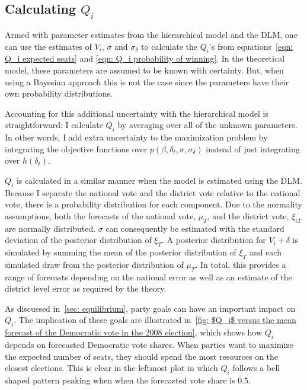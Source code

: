\documentclass[12pt,final,fleqn]{article}
\theoremstyle{plain}
\begin{document}
\subsection{Calculating $Q_i$} \label{sec: calculating Q}
Armed with parameter estimates from the hierarchical model and the DLM, one can use the estimates of $V_{i}$, $\sigma$ and $\sigma_\delta$ to calculate the $Q_i$'s from equations~\ref{eqn: Q_i expected seats} and \ref{eqn: Q_i probability of winning}. In the theoretical model, these parameters are assumed to be known with certainty. But, when using a Bayesian approach this is not the case since the parameters have their own probability distributions. 

Accounting for this additional uncertainty with the hierarchical model is straightforward: I calculate $Q_i$ by averaging over all of the unknown parameters. In other words, I add extra uncertainty to the maximization problem by integrating the objective functions over $p(\beta, \delta_t, \sigma, \sigma_\delta)$ instead of just integrating over $h(\delta_t)$.

$Q_i$ is calculated in a similar manner when the model is estimated using the DLM. Because I separate the national vote and the district vote relative to the national vote, there is a probability distribution for each component. Due to the normality assumptions, both the forecasts of the national vote, $\mu_T$, and the district vote, $\xi_{iT}$ are normally distributed. $\sigma$ can consequently be estimated with the standard deviation of the posterior distribution of $\xi_T$. A posterior distribution for $V_i + \delta$ is simulated by summing the mean of the posterior distribution of $\xi_T$ and each simulated draw from the posterior distribution of $\mu_T$. In total, this provides a range of forecasts depending on the national error as well as an estimate of the district level error as required by the theory.

As discussed in~\autoref{sec: equilibrium}, party goals can have an important impact on $Q_i$. The implication of these goals are illustrated in~\autoref{fig: $Q_i$ versus the mean forecast of the Democratic vote in the 2008 election}, which shows how $Q_i$ depends on forecasted Democratic vote shares. When parties want to maximize the expected number of seats, they should spend the most resources on the closest elections. This is clear in the leftmost plot in which $Q_i$ follows a bell shaped pattern peaking when when the forecasted vote share is $0.5$. 
\end{document}

